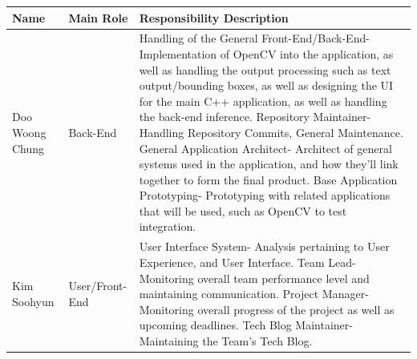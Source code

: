 \documentclass[conference]{IEEEtran}
\begin{document}
\begin{table}[!htbp]
\begin{tabular}{|p{1.5cm}|p{1.5cm}|p{4.7cm}|}
\hline
\textbf{Name} & \textbf{Main Role} & \textbf{Responsibility Description}\\ \hline
Doo Woong Chung & Back-End & 
\newline Handling of the General Front-End/Back-End\newline- Implementation of OpenCV into the application, as well as handling the output processing such as text output/bounding boxes, as well as designing the UI for the main C++ application, as well as handling the back-end inference.
\newline 
\newline Repository Maintainer\newline- Handling Repository Commits, General Maintenance.
\newline 
\newline General Application Architect\newline- Architect of general systems used in the application, and how they'll link together to form the final product. 
\newline 
\newline Base Application Prototyping\newline- Prototyping with related applications that will be used, such as OpenCV to test integration. \\ \hline

Kim Soohyun & User/Front-End & 
\newline User Interface System\newline- Analysis pertaining to User Experience, and User Interface.
\newline 
\newline Team Lead\newline- Monitoring overall team performance level and maintaining communication.
\newline 
\newline Project Manager\newline- Monitoring overall progress of the project as well as upcoming deadlines.
\newline 
\newline Tech Blog Maintainer\newline- Maintaining the Team's Tech Blog.
\\ \hline


\end{tabular}
\end{table}
\end{document}
